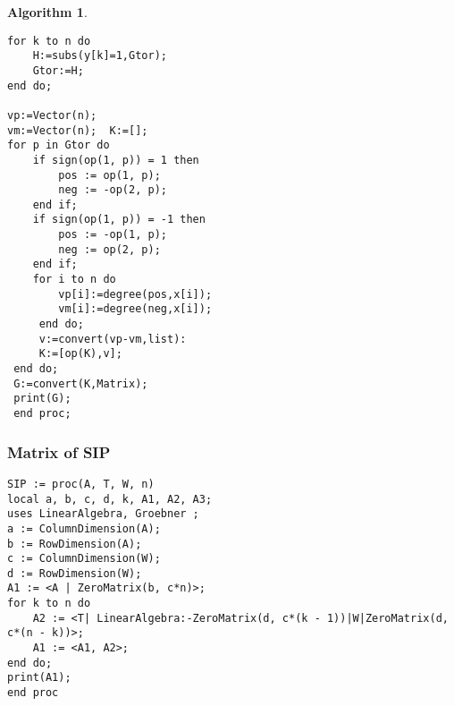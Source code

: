 \documentclass{article}
\theoremstyle{plain}
\theoremstyle{definition}
\newtheorem{algorithm}[theorem]{Algorithm}
\begin{document}
\begin{algorithm}
\begin{verbatim}
for k to n do          
	H:=subs(y[k]=1,Gtor);          
	Gtor:=H;  
end do;    

vp:=Vector(n);  
vm:=Vector(n);  K:=[];    
for p in Gtor do         
	if sign(op(1, p)) = 1 then 
    	pos := op(1, p); 
        neg := -op(2, p); 
    end if;
	if sign(op(1, p)) = -1 then
    	pos := -op(1, p);
    	neg := op(2, p);
	end if;         
    for i to n do                  
    	vp[i]:=degree(pos,x[i]);                  
        vm[i]:=degree(neg,x[i]);          
     end do;         
     v:=convert(vp-vm,list):          
     K:=[op(K),v];  
 end do;  
 G:=convert(K,Matrix);  
 print(G);   
 end proc;
\end{verbatim}

\subsubsection{Matrix of SIP}
\begin{verbatim}
SIP := proc(A, T, W, n) 
local a, b, c, d, k, A1, A2, A3; 
uses LinearAlgebra, Groebner ;
a := ColumnDimension(A); 
b := RowDimension(A); 
c := ColumnDimension(W); 
d := RowDimension(W); 
A1 := <A | ZeroMatrix(b, c*n)>; 
for k to n do 
	A2 := <T| LinearAlgebra:-ZeroMatrix(d, c*(k - 1))|W|ZeroMatrix(d, c*(n - k))>; 
    A1 := <A1, A2>; 
end do; 
print(A1); 
end proc
\end{verbatim}
























\newpage


\end{algorithm}
\end{document}
